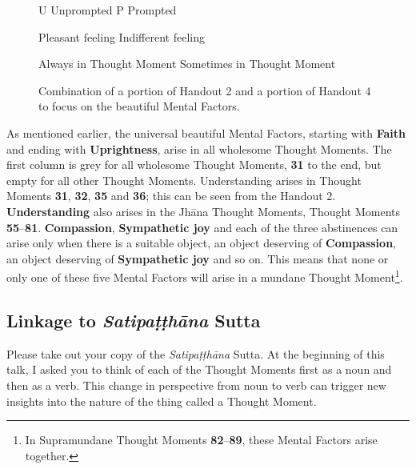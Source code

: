 \begin{figure}[h]
\begin{center}
\noindent
U \hspace{2mm} Unprompted\hspace{5mm} P \hspace{2mm} Prompted

\smiley \hspace {2mm} Pleasant feeling \hspace{5mm} \neutral \hspace{2mm} Indifferent feeling

\tmsmall \hspace{2mm} Always in Thought Moment\hspace{5mm} \lcsmall \hspace{2mm} Sometimes in Thought Moment

\end{center}

\caption{Combination of a portion of Handout 2 and a portion of Handout 4 to focus on the beautiful Mental Factors.}
\label{fig:Wholesome}
\end{figure}

As mentioned earlier, the universal beautiful Mental Factors, starting with \textbf{Faith} and ending with \textbf{Uprightness}, arise in all wholesome Thought Moments. The first column is grey for all wholesome Thought Moments, \textbf{31} to the end, but empty for all other Thought Moments. Understanding arises in Thought Moments \textbf{31}, \textbf{32}, \textbf{35} and \textbf{36}; this can be seen from the Handout 2. \textbf{Understanding} also arises in the Jhāna Thought Moments, Thought Moments \textbf{55}--\textbf{81}. \textbf{Compassion}, \textbf{Sympathetic joy} and each of the three abstinences can arise only when there is a suitable object, an object deserving of \textbf{Compassion}, an object deserving of \textbf{Sympathetic joy} and so on. This means that none or only one of these five Mental Factors will arise in a mundane Thought Moment\footnote{In Supramundane Thought Moments \textbf{82}--\textbf{89}, these Mental Factors arise together.}.

\subsection*{Linkage to \textit{Satipaṭṭhāna} Sutta}

Please take out your copy of the \textit{Satipaṭṭhāna} Sutta. At the beginning of this talk, I asked you to think of each of the Thought Moments first as a noun and then as a verb. This change in perspective from noun to verb can trigger new insights into the nature of the thing called a Thought Moment.

